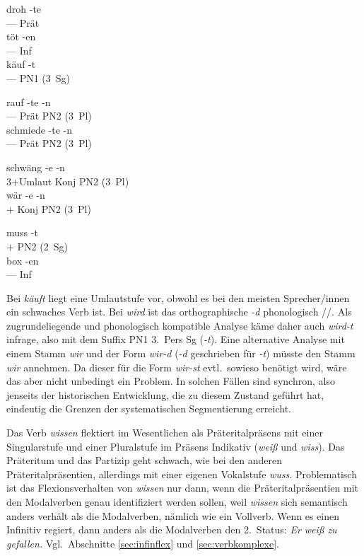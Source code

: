 \begin{exe}
\begin{xlist}
    \ex\gll droh -te\\
    --- Prät\\
    \ex\gll töt -en\\
    --- Inf\\
    \ex\gll käuf -t\\
    --- {PN1 (3~Sg)}\\
  \end{xlist}
  \ex
  \begin{xlist}
    \ex\gll rauf -te -n\\
    --- Prät {PN2 (3~Pl)}\\
    \ex\gll schmiede -te -n\\
    --- Prät {PN2 (3~Pl)}\\
  \end{xlist}
  \ex
  \begin{xlist}
    \ex\gll schwäng -e -n\\
    3+Umlaut Konj {PN2 (3~Pl)}\\
    \ex\gll wär -e -n\\
    $+$ Konj {PN2 (3~Pl)}\\
  \end{xlist}
  \ex
  \begin{xlist}
    \ex\gll muss -t\\
    $+$ {PN2 (2~Sg)}\\
    \ex\gll box -en\\
    --- Inf\\
  \end{xlist}
\end{exe}

Bei \textit{käuft} liegt eine Umlautstufe vor, obwohl es bei den meisten Sprecher\slash innen ein schwaches Verb ist.
Bei \textit{wird} ist das orthographische \textit{-d} phonologisch //.
Als zugrundeliegende und phonologisch kompatible Analyse käme daher auch \textit{wird-t} infrage, also mit dem Suffix PN1 3.~Pers Sg (\textit{-t}).
Eine alternative Analyse mit einem Stamm \textit{wir} und der Form \textit{wir-d} (\textit{-d} geschrieben für \textit{-t}) müsste den Stamm \textit{wir} annehmen.
Da dieser für die Form \textit{wir-st} evtl.\ sowieso benötigt wird, wäre das aber nicht unbedingt ein Problem.
In solchen Fällen sind synchron, also jenseits der historischen Entwicklung, die zu diesem Zustand geführt hat, eindeutig die Grenzen der systematischen Segmentierung erreicht.


Das Verb \textit{wissen} flektiert im Wesentlichen als Präteritalpräsens mit einer Singularstufe und einer Pluralstufe im Präsens Indikativ (\textit{weiß} und \textit{wiss}).
Das Präteritum und das Partizip geht schwach, wie bei den anderen Präteritalpräsentien, allerdings mit einer eigenen Vokalstufe \textit{wuss}.
Problematisch ist das Flexionsverhalten von \textit{wissen} nur dann, wenn die Präteritalpräsentien mit den Modalverben genau identifiziert werden sollen, weil \textit{wissen} sich semantisch anders verhält als die Modalverben, nämlich wie ein Vollverb.
Wenn es einen Infinitiv regiert, dann anders als die Modalverben den 2.~Status: \textit{Er weiß zu gefallen.}
Vgl.\ Abschnitte \ref{sec:infinflex} und \ref{sec:verbkomplexe}.

